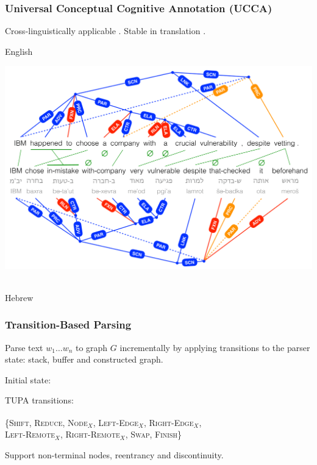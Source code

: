 \documentclass[t,xcolor={svgnames}]{beamer}
\newcommand{\parser}[1]{TUPA\textsubscript{#1}}
\begin{document}
\begin{frame}
\frametitle{Universal Conceptual Cognitive Annotation (UCCA)}
Cross-linguistically applicable \cite{abend2013universal}.
Stable in translation \cite{sulem2015conceptual}.

\vfill
English\\
\vspace{-1cm}
\begin{adjustbox}{center}
  \includegraphics[width=\textwidth,height=\textheight,keepaspectratio]{crosslinguistic.png}
\end{adjustbox}
\\
\vspace{-1cm}
Hebrew
\end{frame}

\begin{frame}
\frametitle{Transition-Based Parsing}
Parse text $w_1 \ldots w_n$ to graph $G$ incrementally by applying transitions to the parser state:
stack, buffer and constructed graph.

\vfill
Initial state:

\vfill
\parser{} transitions:

\{\textsc{Shift, Reduce, Node$_X$, Left-Edge$_X$, Right-Edge$_X$,}\\
\hspace{5mm}\textsc{Left-Remote$_X$, Right-Remote$_X$, Swap, Finish}\}

\vfill
Support {\color{blue}non-terminal nodes}, {\color{orange}reentrancy} and {\color{red}discontinuity}.
\end{frame}
\end{document}
